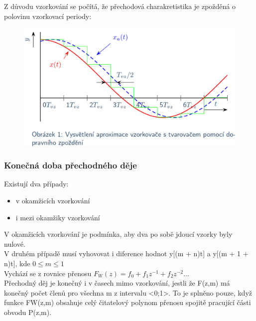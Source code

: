 Z důvodu vzorkování se počítá, že přechodová charakretistika je zpožděná o polovinu vzorkovací periody:
\begin{figure}[H]
    \centering
    \includegraphics*[scale = 0.27]{images/PSDVzorkovaniZpozdeni.png}
\end{figure}

\subsubsection*{Konečná doba přechodného děje}
Existují dva případy:
\begin{itemize}
    \item v okamžicích vzorkování
    \item i mezi okamžiky vzorkování
\end{itemize}
V okamžicích vzorkování je podmínka, aby dva po sobě jdoucí vzorky byly nulové.\\
V druhém případě musí vyhovovat i diference hodnot y[(m + n)t] a y[(m + 1 + n)t], kde $0 \leq m \leq 1$\\
Vychází se z rovnice přenosu $F_W(z) = f_0 + f_1z^{-1}+f_2z^{-2} \dots $ \\
Přechodný děj je konečný i v časech mimo vzorkování, jestli že F(z,m) má konečný počet členů pro všechna m z intervalu <0;1>. To je splněno pouze, když funkce FW(z,m) obsahuje celý čitatelový polynom přenosu spojitě pracující části obvodu P(z,m).\\
